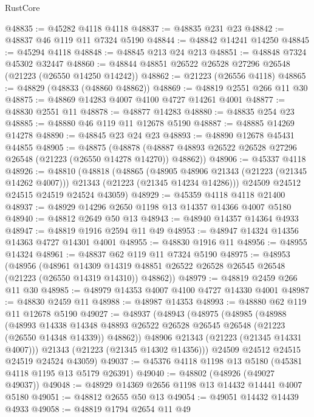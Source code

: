 \begin{lexlean}{RustCore}
\begin{coremodule}
@48835 := @45282 @4118 @4118
@48837 := @48835 @231 @23
@48842 := @48837 @46 @119 @11 @7324 @5190
@48844 := @48842 @14241 @14250
@48845 := @45294 @4118
@48848 := @48845 @213 @24 @213
@48851 := @48848 @7324 @45302 @32447
@48860 := @48844 @48851 @26522 @26528 @27296 @26548 (@21223 (@26550 @14250 @14242))
@48862 := @21223 (@26556 @4118)
@48865 := @48829 (@48833 (@48860 @48862))
@48869 := @48819 @2551 @266 @11 @30
@48875 := @48869 @14283 @4007 @4100 @4727 @14261 @4001
@48877 := @48830 @2551 @11
@48878 := @48877 @14283
@48880 := @48835 @254 @23
@48885 := @48880 @46 @119 @11 @12678 @5190
@48887 := @48885 @14269 @14278
@48890 := @48845 @23 @24 @23
@48893 := @48890 @12678 @45431 @44855
@48905 := @48875
    (@48878 (@48887 @48893 @26522 @26528 @27296 @26548 (@21223 (@26550 @14278 @14270)) @48862))
@48906 := @45337 @4118
@48926 := @48810
    (@48818
      (@48865
        (@48905 @48906 @21343 (@21223 (@21345 @14262 @4007)))
        @21343
        (@21223 (@21345 @14234 @14286)))
      @24509
      @24512
      @24515
      @24519
      @24524
      @43059)
@48929 := @45359 @4118 @4118 @21400
@48937 := @48929 @14296 @2650 @1198 @13 @14357 @14366 @4007 @5180
@48940 := @48812 @2649 @50 @13
@48943 := @48940 @14357 @14364 @4933
@48947 := @48819 @1916 @2594 @11 @49
@48953 := @48947 @14324 @14356 @14363 @4727 @14301 @4001
@48955 := @48830 @1916 @11
@48956 := @48955 @14324
@48961 := @48837 @62 @119 @11 @7324 @5190
@48975 := @48953
    (@48956
      (@48961
        @14309
        @14319
        @48851
        @26522
        @26528
        @26545
        @26548
        (@21223 (@26550 @14319 @14310))
        @48862))
@48979 := @48819 @2459 @266 @11 @30
@48985 := @48979 @14353 @4007 @4100 @4727 @14330 @4001
@48987 := @48830 @2459 @11
@48988 := @48987 @14353
@48993 := @48880 @62 @119 @11 @12678 @5190
@49027 := @48937
    (@48943
      (@48975
        (@48985
          (@48988
            (@48993
              @14338
              @14348
              @48893
              @26522
              @26528
              @26545
              @26548
              (@21223 (@26550 @14348 @14339))
              @48862))
          @48906
          @21343
          (@21223 (@21345 @14331 @4007)))
        @21343
        (@21223 (@21345 @14302 @14356)))
      @24509
      @24512
      @24515
      @24519
      @24524
      @43059)
@49037 := @45376 @4118 @1198 @13 @5180 (@45381 @4118 @1195 @13 @5179 @26391)
@49040 := @48802 (@48926 (@49027 @49037))
@49048 := @48929 @14369 @2656 @1198 @13 @14432 @14441 @4007 @5180
@49051 := @48812 @2655 @50 @13
@49054 := @49051 @14432 @14439 @4933
@49058 := @48819 @1794 @2654 @11 @49

\end{coremodule}
\end{lexlean}
